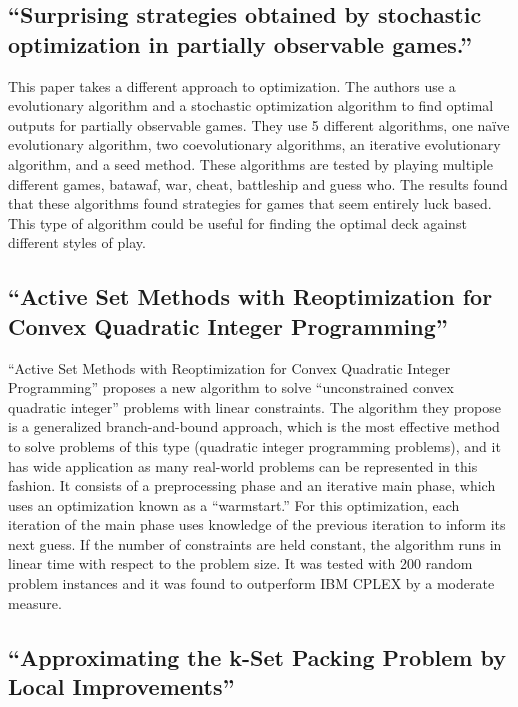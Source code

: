 \documentclass[12pt, letterpaper]{article}
\begin{document}
\subsection{\enquote{Surprising strategies obtained by stochastic optimization in partially observable games.}}
\label{sec:3.4}

This paper takes a different approach to optimization.
The authors use a evolutionary algorithm and a stochastic optimization algorithm
to find optimal outputs for partially observable games.
They use 5 different algorithms, one naïve evolutionary algorithm, two coevolutionary algorithms,
an iterative evolutionary algorithm, and a seed method.
These algorithms are tested by playing multiple different games, batawaf, war, cheat, battleship and guess who.
The results found that these algorithms found strategies for games that seem entirely luck based.
This type of algorithm could be useful for finding the optimal deck against different styles of play.

\subsection{\enquote{Active Set Methods with Reoptimization for Convex Quadratic Integer Programming}}
\label{sec:3.5}

\enquote{Active Set Methods with Reoptimization for Convex Quadratic Integer Programming}
proposes a new algorithm to solve \enquote{unconstrained convex quadratic integer}
problems with linear constraints.
The algorithm they propose is a generalized branch-and-bound approach,
which is the most effective method to solve problems of this type (quadratic integer programming problems),
and it has wide application as many real-world problems can be represented in this fashion.
It consists of a preprocessing phase and an iterative main phase,
which uses an optimization known as a \enquote{warmstart.}
For this optimization,
each iteration of the main phase uses knowledge of the previous iteration to inform its next guess.
If the number of constraints are held constant,
the algorithm runs in linear time with respect to the problem size.
It was tested with 200 random problem instances and it was found to outperform IBM CPLEX by a moderate measure.

\subsection{\enquote{Approximating the k-Set Packing Problem by Local Improvements}}
\label{sec:3.6}
\end{document}

